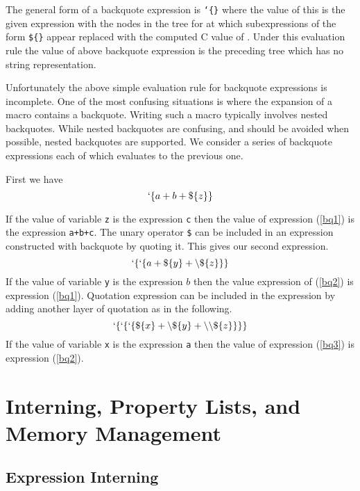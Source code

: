 \documentclass{article}
\begin{document}
The general form of a backquote expression is {\tt `\{<exp1>\}} where the value of this is the given expression {\tt <exp1>} with the nodes
in the tree for {\tt <exp1>} at which subexpressions
of the form {\tt \$\{<exp2>\}} appear replaced with the computed C value of {\tt <exp2>}.  Under this evaluation rule the value of above backquote expression is the preceding tree
which has no string representation.

Unfortunately the above simple evaluation rule for backquote expressions is incomplete.  One of the most
confusing situations is where the expansion of a macro contains a backquote.  Writing such a macro typically involves nested backquotes.  While nested backquotes
are confusing, and should be avoided when possible, nested backquotes are supported.  We consider a series of backquote expressions each of which evaluates to the previous one.

First we have
\begin{equation}
\label{bq1}
`\{a+b+\$\{z\}\}
\end{equation}

If the value of variable {\tt z} is the expression {\tt c} then the value of expression (\ref{bq1}) is the expression {\tt a+b+c}.
The unary operator {\tt \$} can be included in an expression constructed with backquote by quoting it.  This gives our second expression.
\begin{equation}
\label{bq2}
`\{`\{a + \$\{y\} + \backslash\$\{z\}\}\}
\end{equation}
If the value of variable {\tt y} is the expression $b$ then the value expression of (\ref{bq2}) is expression (\ref{bq1}).
Quotation expression can be included in the expression by adding another layer of quotation as in the following.
\begin{equation}
\label{bq3}
`\{`\{`\{\$\{x\} + \backslash\$\{y\} + \backslash\backslash\$\{z\}\}\}\}
\end{equation}
If the value of variable {\tt x} is the expression {\tt a} then the value of expression (\ref{bq3}) is expression (\ref{bq2}).

\section{Interning, Property Lists, and Memory Management}

\subsection{Expression Interning}
\end{document}
